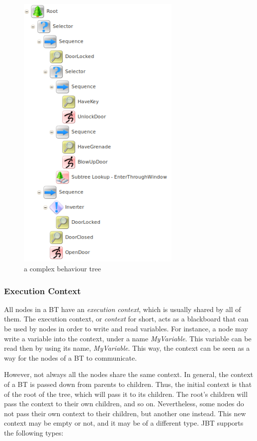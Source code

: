 \documentclass[a4paper]{article}
\begin{document}
\begin{figure}
 \centering
 \includegraphics[width=0.7\textwidth]{./Images/ComplexEnterRoom.png}
 \caption{a complex behaviour tree}
 \label{fig:ComplexEnterRoom}
\end{figure}

\subsubsection{Execution Context}\label{sec:ExecutionContext}

All nodes in a BT have an \textit{execution context}, which is usually shared by all of them. The execution context, or \textit{context} for short, acts as a blackboard that can be used by nodes in order to write and read variables. For instance, a node may write a variable into the context, under a name \textit{MyVariable}. This variable can be read then by using its name, \textit{MyVariable}. This way, the context can be seen as a way for the nodes of a BT to communicate.

However, not always all the nodes share the same context. In general, the context of a BT is passed down from parents to children. Thus, the initial context is that of the root of the tree, which will pass it to its children. The root's children will pass the context to their own children, and so on. Nevertheless, some nodes do not pass their own context to their children, but another one instead. This new context may be empty or not, and it may be of a different type. JBT supports the following types:
\end{document}
